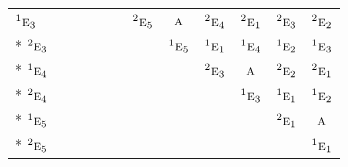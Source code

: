 \documentclass[10pt,a4paper]{article}
\numberwithin{equation}{section}
\newcommand{\irr}[1]{\text{\normalfont\scshape #1}}
\newcommand{\conjpair}[1]{{}^{#1}}
\begin{document}
{\begin{longtable}{@{}lccccccccccc@{}}
$\conjpair{1}\irr{e}_{3}$ &  &  &  &  &  & $\conjpair{2}\irr{e}_{5}$ & $\irr{a}$ & $\conjpair{2}\irr{e}_{4}$ & $\conjpair{2}\irr{e}_{1}$ & $\conjpair{2}\irr{e}_{3}$ & $\conjpair{2}\irr{e}_{2}$\\*
$\conjpair{2}\irr{e}_{3}$ &  &  &  &  &  &  & $\conjpair{1}\irr{e}_{5}$ & $\conjpair{1}\irr{e}_{1}$ & $\conjpair{1}\irr{e}_{4}$ & $\conjpair{1}\irr{e}_{2}$ & $\conjpair{1}\irr{e}_{3}$\\*
$\conjpair{1}\irr{e}_{4}$ &  &  &  &  &  &  &  & $\conjpair{2}\irr{e}_{3}$ & $\irr{a}$ & $\conjpair{2}\irr{e}_{2}$ & $\conjpair{2}\irr{e}_{1}$\\*
$\conjpair{2}\irr{e}_{4}$ &  &  &  &  &  &  &  &  & $\conjpair{1}\irr{e}_{3}$ & $\conjpair{1}\irr{e}_{1}$ & $\conjpair{1}\irr{e}_{2}$\\*
$\conjpair{1}\irr{e}_{5}$ &  &  &  &  &  &  &  &  &  & $\conjpair{2}\irr{e}_{1}$ & $\irr{a}$\\*
$\conjpair{2}\irr{e}_{5}$ &  &  &  &  &  &  &  &  &  &  & $\conjpair{1}\irr{e}_{1}$\\
\bottomrule\end{longtable}}
\end{document}
